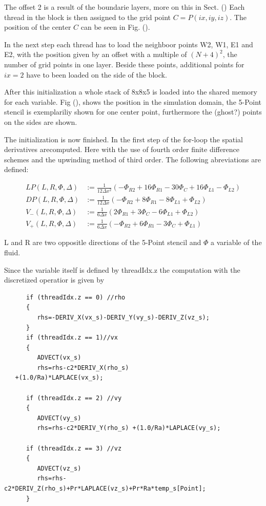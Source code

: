 The offset 2 is a result  of the boundarie layers, more on this in Sect. ()
Each thread in the block is then assigned to the grid point $C = P(ix, iy, iz)$.
The position of the center $C$ can be seen in Fig. ().

In the next step each thread has to load the neighboor points W2, W1, E1 and E2,
with the position given by an offset with a multiple of $(N+4)^2$, the number of grid points in one layer.
Beside these points, additional points for $ix=2$ have to been loaded on the side of the block.

After this initialization a whole stack of 8x8x5 is loaded into the shared memory for each variable.
Fig (), shows the position in the simulation domain, the 5-Point stencil is exemplariliy shown for one center point,
furthermore the (ghost?) points on the sides are shown.

The initialization is now finished. In the first step of the for-loop the spatial derivatives arecomputed.
Here with the  use of fourth order finite difference schemes and the upwinding method of third order.
The following abreviations are defined:

\begin{align}
    LP (L, R, \Phi, \Delta)  &:=  \frac{1}{12\Delta x^2} \left(-\Phi_{R2} + 16\Phi_{R1} - 30\Phi_C +16\Phi_{L1} - \Phi_{L2} \right)\\
    DP (L, R, \Phi, \Delta)  &:=  \frac{1}{12\Delta x}   \left(-\Phi_{R2} + 8\Phi_{R1}  -8\Phi_{L1} + \Phi_{L2} \right)\\
    V_-(L, R, \Phi, \Delta)  &:=  \frac{1}{6\Delta x}  \left( 2\Phi_{R1} + 3\Phi_C  - 6\Phi_{L1} + \Phi_{L2}  \right)\\
    V_+(L, R, \Phi, \Delta)  &:=  \frac{1}{6\Delta x}  \left( -\Phi_{R2} + 6\Phi_{R1}  - 3\Phi_{C} + \Phi_{L1}  \right)
\end{align}

L and R are two oppositle directions of the 5-Point stencil and $\Phi$ a variable of the fluid.

\clearpage

Since the variable itself is defined by threadIdx.z the computation with the discretized operatior is given by

\begin{verbatim}
      if (threadIdx.z == 0) //rho
      {
         rhs=-DERIV_X(vx_s)-DERIV_Y(vy_s)-DERIV_Z(vz_s);
      }
      if (threadIdx.z == 1)//vx
      {
         ADVECT(vx_s)
         rhs=rhs-c2*DERIV_X(rho_s)
   +(1.0/Ra)*LAPLACE(vx_s);

      if (threadIdx.z == 2) //vy
      {
         ADVECT(vy_s)
         rhs=rhs-c2*DERIV_Y(rho_s) +(1.0/Ra)*LAPLACE(vy_s);

      if (threadIdx.z == 3) //vz
      {
         ADVECT(vz_s)
         rhs=rhs-c2*DERIV_Z(rho_s)+Pr*LAPLACE(vz_s)+Pr*Ra*temp_s[Point];
      }
\end{verbatim}


